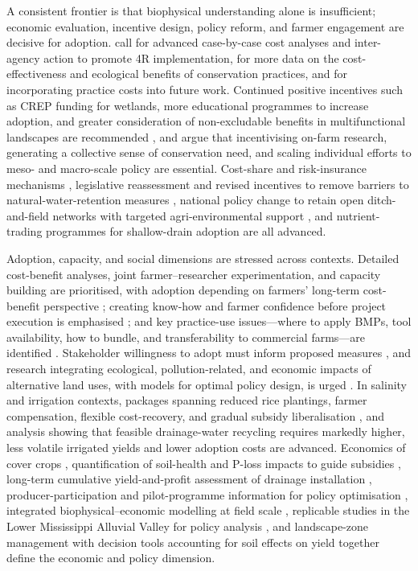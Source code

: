 \documentclass[11pt]{article}
\begin{document}
A consistent frontier is that biophysical understanding alone is insufficient; economic evaluation, incentive design, policy reform, and farmer engagement are decisive for adoption. \textcite{Liu2021} call for advanced case-by-case cost analyses and inter-agency action to promote 4R implementation, \textcite{Yuan2022} for more data on the cost-effectiveness and ecological benefits of conservation practices, and \textcite{McLellan2015} for incorporating practice costs into future work. Continued positive incentives such as CREP funding for wetlands, more educational programmes to increase adoption, and greater consideration of non-excludable benefits in multifunctional landscapes are recommended \parencite{Christianson2014}, and \textcite{David2015} argue that incentivising on-farm research, generating a collective sense of conservation need, and scaling individual efforts to meso- and macro-scale policy are essential. Cost-share and risk-insurance mechanisms \parencite{Jaynes2012,Karlen2005}, legislative reassessment and revised incentives to remove barriers to natural-water-retention measures \parencite{Kvítek2023}, national policy change to retain open ditch-and-field networks with targeted agri-environmental support \parencite{Marja2013}, and nutrient-trading programmes for shallow-drain adoption \parencite{Ghane2021b} are all advanced.

Adoption, capacity, and social dimensions are stressed across contexts. Detailed cost-benefit analyses, joint farmer--researcher experimentation, and capacity building are prioritised, with adoption depending on farmers' long-term cost-benefit perspective \parencite{Okwany2016}; creating know-how and farmer confidence before project execution is emphasised \parencite{Ghumman2011}; and key practice-use issues---where to apply BMPs, tool availability, how to bundle, and transferability to commercial farms---are identified \parencite{Ward2018}. Stakeholder willingness to adopt must inform proposed measures \parencite{Cuevas2019}, and research integrating ecological, pollution-related, and economic impacts of alternative land uses, with models for optimal policy design, is urged \parencite{Saikkonen2014}. In salinity and irrigation contexts, packages spanning reduced rice plantings, farmer compensation, flexible cost-recovery, and gradual subsidy liberalisation \parencite{Kotb2000}, and analysis showing that feasible drainage-water recycling requires markedly higher, less volatile irrigated yields and lower adoption costs \parencite{Sellars2022} are advanced. Economics of cover crops \parencite{Waring2020}, quantification of soil-health and P-loss impacts to guide subsidies \parencite{Roth2018}, long-term cumulative yield-and-profit assessment of drainage installation \parencite{Mourtzinis2021}, producer-participation and pilot-programme information for policy optimisation \parencite{Malone2023}, integrated biophysical--economic modelling at field scale \parencite{Ferin2023}, replicable studies in the Lower Mississippi Alluvial Valley for policy analysis \parencite{Kröger2012}, and landscape-zone management with decision tools accounting for soil effects on yield \parencite{Bakhsh2007b,Nelson2011,Kanwar1997} together define the economic and policy dimension.
\end{document}
